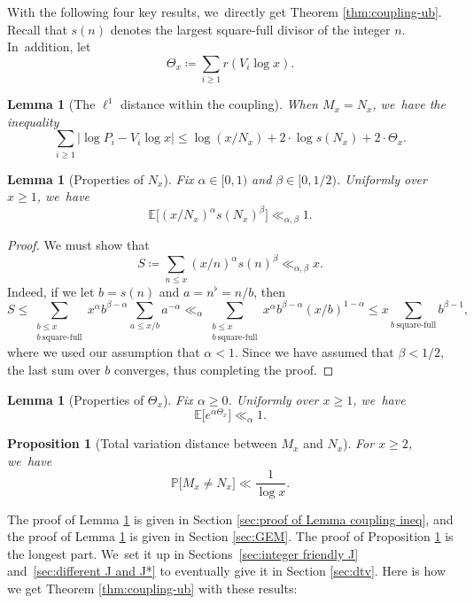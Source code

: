 \documentclass[JEP,XML,SOM,Unicode,published]{cedram}
\newcommand{\PP}{\mathbb{P}}
\newcommand{\EE}{\mathbb{E}}
\newcommand{\bg}{\big}
\theoremstyle{plain}
\newtheorem{lem}[cor]{Lemma}
\newtheorem{prop}[cor]{Proposition}
\theoremstyle{definition}
\begin{document}
With the following four key results, we~directly get Theorem \ref{thm:coupling-ub}. Recall that $s(n)$ denotes the largest square-full divisor of the integer $n$. In~addition, let
\begin{equation}
\label{eq:def of Theta_x}
\Theta_x \coloneqq \sum_{i \ge 1} r(V_i\log x).
\end{equation}

\begin{lem}[The $\ell^1$ distance within the coupling]
\label{lem:coupling ineq}
When $M_x = N_x$, we~have the inequality
\[
\sum_{i \ge 1} |{\log P_i - V_i\log x}| \le \log(x/N_x) + 2\cdot \log s(N_x) + 2\cdot \Theta_x.
\]
\end{lem}

\begin{lem}[Properties of $N_x$]
\label{lem:properties of N}
Fix $\alpha\in[0,1)$ and $\beta\in[0,1/2)$. Uniformly over $x\ge1$, we~have
\[
\EE\bg[(x/N_x)^\alpha s(N_x)^\beta\bg] \ll_{\alpha,\beta} 1.
\]
\end{lem}

\begin{proof} We must show that
\[
S\coloneqq \sum_{n \le x} (x/n)^\alpha s(n)^\beta\ll_{\alpha,\beta} x.
\]
Indeed, if we let $b=s(n)$ and $a=n^\flat=n/b$, then
\[
S\le \sum_{\substack{b\le x \\ b\ \text{square-full} }} x^\alpha b^{\beta-\alpha} \sum_{a\le x/b} a^{-\alpha}
\ll_\alpha \sum_{\substack{b\le x \\ b\ \text{square-full} }} x^\alpha b^{\beta-\alpha} (x/b)^{1-\alpha}
\le x \sum_{b\ \text{square-full} } b^{\beta-1},
\]
where we used our assumption that $\alpha<1$.
Since we have assumed that $\beta<1/2$, the last sum over $b$ converges, thus completing the proof.
\end{proof}

\begin{lem}[Properties of $\Theta_x$]
\label{lem:properties of Theta}
Fix $\alpha\ge 0$. Uniformly over $x\ge1$, we~have
\[
\EE\bg[e^{\alpha \Theta_x}\bg] \ll_{\alpha} 1.
\]
\end{lem}

\begin{prop}[Total variation distance between $M_x$ and $N_x$]
\label{prop:dtv of M and N}
For $x \ge 2$, we~have
\[
\PP\bg[M_x \ne N_x\bg] \ll \frac{1}{\log x}.
\]
\end{prop}

The proof of Lemma \ref{lem:coupling ineq} is given in Section \ref{sec:proof of Lemma coupling ineq}, and the proof of Lemma \ref{lem:properties of Theta} is given in Section \ref{sec:GEM}. The proof of Proposition \ref{prop:dtv of M and N} is the longest part. We~set it up in Sections~\ref{sec:integer friendly J} and~\ref{sec:different J and J*} to eventually give it in Section \ref{sec:dtv}. Here is how we get Theorem \ref{thm:coupling-ub} with these results:
\end{document}
